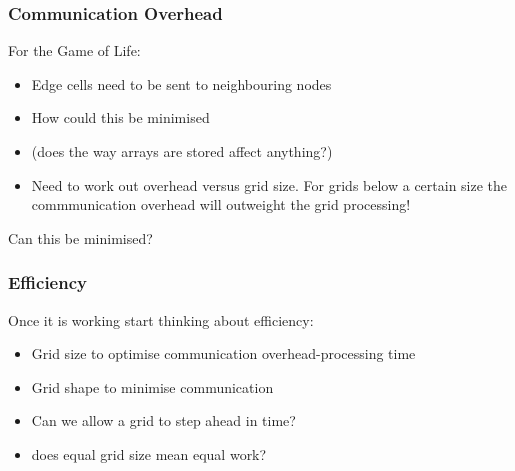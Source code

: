 \documentclass{beamer}
\begin{document}
       \begin{frame}
       	\frametitle{Communication Overhead}
       	For the Game of Life:
       	\begin{itemize}
       		\item Edge cells need to be sent to neighbouring nodes 
       		\item How could this be minimised
       		\item (does the way arrays are stored affect anything?)
       		\item Need to work out overhead versus grid size.  For grids below a certain size the commmunication overhead will outweight the grid processing!
       	\end{itemize}
       	Can this be minimised?
       \end{frame}         	
        \begin{frame}
        	\frametitle{Efficiency}
        	Once it is working start thinking about efficiency:
        	\begin{itemize}
        		\item Grid size to optimise communication overhead-processing time 
        		\item Grid shape to minimise communication
        		\item Can we allow a grid to step ahead in time?
        		\item does equal grid size mean equal work?
        	\end{itemize}
        \end{frame}       	
        	
  

        
\end{document}
